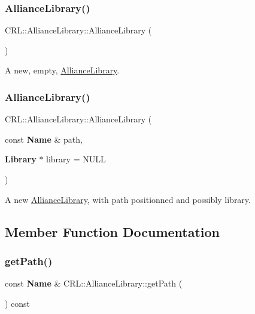 \subsubsection{\texorpdfstring{Alliance\+Library()}{AllianceLibrary()}\hspace{0.1cm}{\footnotesize\ttfamily [1/2]}}
{\footnotesize\ttfamily C\+R\+L\+::\+Alliance\+Library\+::\+Alliance\+Library (\begin{DoxyParamCaption}{ }\end{DoxyParamCaption})}

A new, empty, \mbox{\hyperlink{classCRL_1_1AllianceLibrary}{Alliance\+Library}}. \mbox{\label{classCRL_1_1AllianceLibrary_a1a0c9a0f2b74eaae859206e5338107a0}} 
\subsubsection{\texorpdfstring{Alliance\+Library()}{AllianceLibrary()}\hspace{0.1cm}{\footnotesize\ttfamily [2/2]}}
{\footnotesize\ttfamily C\+R\+L\+::\+Alliance\+Library\+::\+Alliance\+Library (\begin{DoxyParamCaption}\item[{const \textbf{ Name} \&}]{path,  }\item[{\textbf{ Library} $\ast$}]{library = {\ttfamily NULL} }\end{DoxyParamCaption})}

A new \mbox{\hyperlink{classCRL_1_1AllianceLibrary}{Alliance\+Library}}, with {\ttfamily path} positionned and possibly {\ttfamily library}. 

\subsection{Member Function Documentation}
\mbox{\label{classCRL_1_1AllianceLibrary_a3be21e668a6a01085df037989eacf6f8}} 
\subsubsection{\texorpdfstring{get\+Path()}{getPath()}}
{\footnotesize\ttfamily const \textbf{ Name} \& C\+R\+L\+::\+Alliance\+Library\+::get\+Path (\begin{DoxyParamCaption}{ }\end{DoxyParamCaption}) const\hspace{0.3cm}{\ttfamily [inline]}}

